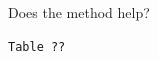 \documentclass{article}
\begin{document}
Does the method help?
\begin{verbatim}
Table ??
\end{verbatim}
\end{document}
